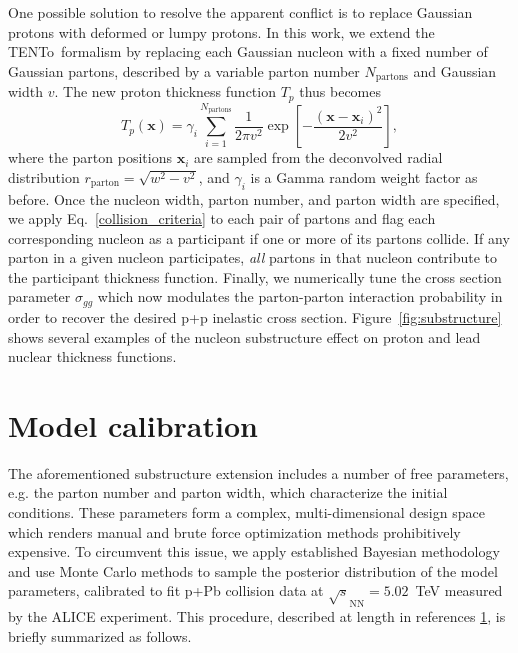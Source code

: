 \documentclass[3p,times,procedia]{elsarticle}
\newcommand{\trento}{T\raisebox{-0.3ex}{R}ENTo}
\begin{document}
One possible solution to resolve the apparent conflict is to replace Gaussian protons with deformed or lumpy protons.
In this work, we extend the \trento\ formalism by replacing each Gaussian nucleon with a fixed number of Gaussian partons, described by a variable parton number $N_\mathrm{partons}$ and Gaussian width $v$.
The new proton thickness function $T_p$ thus becomes
\begin{equation}
  T_p(\mathbf{x}) = \gamma_i \sum\limits_{i=1}^{N_\mathrm{partons}} \frac{1}{2 \pi v^2} \exp\left[{-}\frac{(\mathbf{x} - \mathbf{x}_i)^2}{2 v^2}\right],
\end{equation}
where the parton positions $\mathbf{x}_i$ are sampled from the deconvolved radial distribution $r_\mathrm{parton} = \sqrt{w^2 - v^2}$, and $\gamma_i$ is a Gamma random weight factor as before.
Once the nucleon width, parton number, and parton width are specified, we apply Eq.~\eqref{collision_criteria} to each pair of partons and flag each corresponding nucleon as a participant if one or more of its partons collide.
If any parton in a given nucleon participates, \emph{all} partons in that nucleon contribute to the participant thickness function.
Finally, we numerically tune the cross section parameter $\sigma_{gg}$ which now modulates the parton-parton interaction probability in order to recover the desired p+p inelastic cross section.
Figure~\ref{fig:substructure} shows several examples of the nucleon substructure effect on proton and lead nuclear thickness functions.

\section{Model calibration}
\label{}
The aforementioned substructure extension includes a number of free parameters, e.g. the parton number and parton width, which characterize the initial conditions.
These parameters form a complex, multi-dimensional design space which renders manual and brute force optimization methods prohibitively expensive. 
To circumvent this issue, we apply established Bayesian methodology and use Monte Carlo methods to sample the posterior distribution of the model parameters, calibrated to fit p+Pb collision data at $\sqrt{s}_\mathrm{NN} = 5.02$~TeV measured by the ALICE experiment.
This procedure, described at length in references \ref{}, is briefly summarized as follows.
\end{document}
